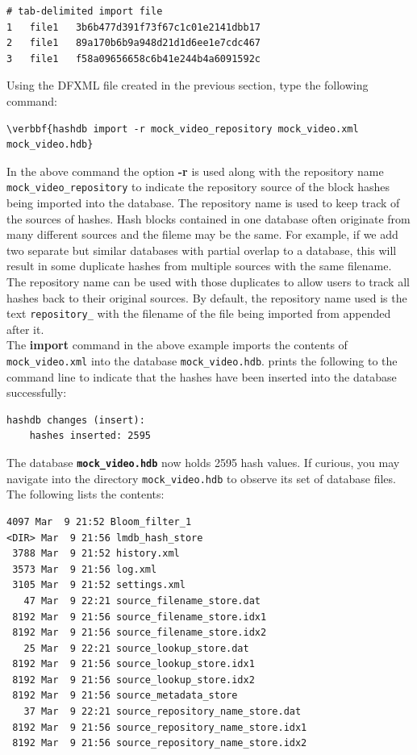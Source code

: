 \documentclass[11pt,fleqn]{article} %
\begin{document}
\lstset{style=customfile}
\begin{lstlisting}[float, caption={Example content of a tab-delimited import file}, label=importTabFile]
# tab-delimited import file
1	file1	3b6b477d391f73f67c1c01e2141dbb17
2	file1	89a170b6b9a948d21d1d6ee1e7cdc467
3	file1	f58a09656658c6b41e244b4a6091592c
\end{lstlisting}


Using the DFXML file created in the previous section, type the following command:
\begin{Verbatim}[commandchars=\\\{\}]
\verbbf{hashdb import -r mock_video_repository mock_video.xml mock_video.hdb}
\end{Verbatim}
In the above command the option \textbf{-r} is used along with the repository name \texttt{mock\_video\_repository} to indicate the repository source of the block hashes being imported into the database. The repository name is used to keep track of the sources of hashes. Hash blocks contained in one database often originate from many different sources and the fileme may be the same. For example, if we add two separate but similar databases with partial overlap to a database, this will result in some duplicate hashes from multiple sources with the same filename. The repository name can be used with those duplicates to allow users to track all hashes back to their original sources. By default, the repository name used is the text \texttt{repository\_} with the filename of the file being imported from appended after it.\\

The \textbf{import} command in the above example imports the contents of \texttt{mock\_video.xml} into the database \texttt{mock\_video.hdb}. \hash prints the following to the command line to indicate that the hashes have been inserted into the database successfully: 

\begingroup
\footnotesize
\begin{Verbatim}[fontfamily=courier]
hashdb changes (insert):
    hashes inserted: 2595
\end{Verbatim}
\endgroup
The database \texttt{\textbf{mock\_video.hdb}} now holds 2595 hash values.
If curious, you may navigate into the directory \texttt{mock\_video.hdb} to observe its set of database files. The following lists the contents:
\begingroup
\footnotesize
\begin{Verbatim}[fontfamily=courier]
 4097 Mar  9 21:52 Bloom_filter_1
<DIR> Mar  9 21:56 lmdb_hash_store
 3788 Mar  9 21:52 history.xml
 3573 Mar  9 21:56 log.xml
 3105 Mar  9 21:52 settings.xml
   47 Mar  9 22:21 source_filename_store.dat
 8192 Mar  9 21:56 source_filename_store.idx1
 8192 Mar  9 21:56 source_filename_store.idx2
   25 Mar  9 22:21 source_lookup_store.dat
 8192 Mar  9 21:56 source_lookup_store.idx1
 8192 Mar  9 21:56 source_lookup_store.idx2
 8192 Mar  9 21:56 source_metadata_store
   37 Mar  9 22:21 source_repository_name_store.dat
 8192 Mar  9 21:56 source_repository_name_store.idx1
 8192 Mar  9 21:56 source_repository_name_store.idx2
\end{Verbatim}
\endgroup
\end{document}
